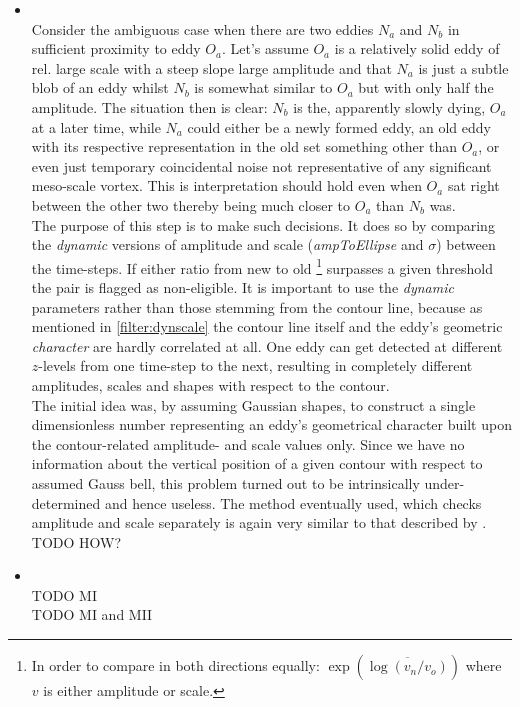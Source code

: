 \begin{itemize}
	\item
	 \\
	 Consider the ambiguous case when there are two eddies $N_a$ and $N_b$ in sufficient proximity to eddy $O_a$. Let's assume $O_a$ is a relatively solid eddy of rel. large scale with a steep slope \ie large amplitude and that $N_a$ is just a subtle blob of an eddy whilst $N_b$ is somewhat similar to $O_a$ but with only half the amplitude. The situation then is clear: $N_b$ is the, apparently slowly dying, $O_a$ at a later time, while $N_a$ could either be a newly formed eddy, an old eddy with its respective representation in the old set something other than $O_a$, or even just temporary coincidental noise not representative of any significant meso-scale vortex. This is interpretation should hold even when $O_a$ sat right between the other two thereby being much closer to $O_a$ than $N_b$ was.\\
	 The purpose of this step is to make such decisions. It does so by comparing the \textit{dynamic} versions of amplitude and scale (\textit{ampToEllipse} and $\sigma$) between the time-steps. If either ratio from new to old \footnote{In order to compare in both directions equally: $\exp{(\overline{\log{(v_n/v_o)}})}$ where $v$ is either amplitude or scale.} surpasses a given threshold the pair is flagged as non-eligible. It is important to use the \textit{dynamic} parameters rather than those stemming from the contour line, because as mentioned  in \ref{filter:dynscale} the contour line itself and the eddy's  geometric \textit{character} are hardly correlated at all. One eddy can get detected at different $z$-levels from one time-step to the next, resulting in completely different amplitudes, scales and shapes with respect to the contour.\\
	The initial idea was, by assuming Gaussian shapes, to construct a single dimensionless number representing an eddy's geometrical character built upon the contour-related amplitude- and scale values only. Since we have no information about the vertical position of a given contour with respect to assumed Gauss bell, this problem turned out to be intrinsically under-determined and hence useless. The method eventually used, which checks amplitude and scale separately is again very similar to that described by \cite{chelton2011}. TODO HOW?
  \item
 \\
 TODO MI
\\
 TODO MI and MII
\end{itemize}




